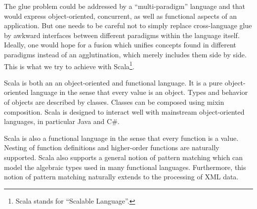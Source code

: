 The glue problem could be addressed by a ``multi-paradigm'' language
and that would express object-oriented, concurrent, as well as
functional aspects of an application.  But one needs to be careful not
to simply replace cross-language glue by awkward interfaces between
different paradigms within the language itself.  Ideally, one would
hope for a fusion which unifies concepts found in different paradigms
instead of an agglutination, which merely includes them side by side.
This is what we try to achieve with Scala\footnote{Scala stands for
``Scalable Language''.}.

Scala is both an an object-oriented and functional language.  It is a
pure object-oriented language in the sense that every value is an
object. Types and behavior of objects are described by
classes. Classes can be composed using mixin composition.  Scala is
designed to interact well with mainstream object-oriented languages,
in particular Java and C\#.

Scala is also a functional language in the sense that every function
is a value. Nesting of function definitions and higher-order functions
are naturally supported. Scala also supports a general notion of
pattern matching which can model the algebraic types used in many
functional languages. Furthermore, this notion of pattern matching
naturally extends to the processing of XML data.

